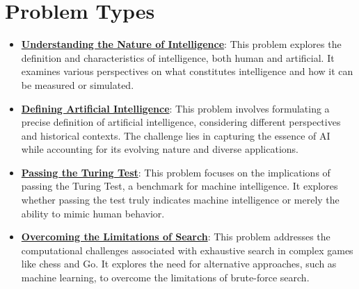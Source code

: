 \documentclass{article}%
\begin{document}
\section{Problem Types}%
\label{sec:ProblemTypes}%
\begin{itemize}[leftmargin=*]%
\item \href{https://purdue.brightspace.com/d2l/common/assets/pdfjs-d2l-dist/1.0.14-legacy/web/viewer.html?file=\%2Fcontent\%2Fenforced\%2F1095467-wl.202510.CS.24300.001\%2F02L2-Intro.pdf\%3Fou\%3D1095467\&lang=en-us\&container=d2l-fileviewer-rendered-pdf\&fullscreen=d2l-fileviewer-rendered-pdf-dialog\&height=667#page=5}{\textbf{Understanding the Nature of Intelligence}}: This problem explores the definition and characteristics of intelligence, both human and artificial. It examines various perspectives on what constitutes intelligence and how it can be measured or simulated.%
\item \href{https://purdue.brightspace.com/d2l/common/assets/pdfjs-d2l-dist/1.0.14-legacy/web/viewer.html?file=\%2Fcontent\%2Fenforced\%2F1095467-wl.202510.CS.24300.001\%2F02L2-Intro.pdf\%3Fou\%3D1095467\&lang=en-us\&container=d2l-fileviewer-rendered-pdf\&fullscreen=d2l-fileviewer-rendered-pdf-dialog\&height=667#page=5}{\textbf{Defining Artificial Intelligence}}: This problem involves formulating a precise definition of artificial intelligence, considering different perspectives and historical contexts. The challenge lies in capturing the essence of AI while accounting for its evolving nature and diverse applications.%
\item \href{https://purdue.brightspace.com/d2l/common/assets/pdfjs-d2l-dist/1.0.14-legacy/web/viewer.html?file=\%2Fcontent\%2Fenforced\%2F1095467-wl.202510.CS.24300.001\%2F02L2-Intro.pdf\%3Fou\%3D1095467\&lang=en-us\&container=d2l-fileviewer-rendered-pdf\&fullscreen=d2l-fileviewer-rendered-pdf-dialog\&height=667#page=6}{\textbf{Passing the Turing Test}}: This problem focuses on the implications of passing the Turing Test, a benchmark for machine intelligence. It explores whether passing the test truly indicates machine intelligence or merely the ability to mimic human behavior.%
\item \href{https://purdue.brightspace.com/d2l/common/assets/pdfjs-d2l-dist/1.0.14-legacy/web/viewer.html?file=\%2Fcontent\%2Fenforced\%2F1095467-wl.202510.CS.24300.001\%2F02L2-Intro.pdf\%3Fou\%3D1095467\&lang=en-us\&container=d2l-fileviewer-rendered-pdf\&fullscreen=d2l-fileviewer-rendered-pdf-dialog\&height=667#page=11}{\textbf{Overcoming the Limitations of Search}}: This problem addresses the computational challenges associated with exhaustive search in complex games like chess and Go. It explores the need for alternative approaches, such as machine learning, to overcome the limitations of brute{-}force search.%

\end{itemize}
\end{document}
